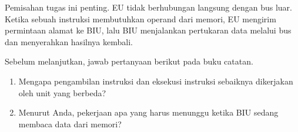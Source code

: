 \begin{infobox}
\vspace{1.1em}
Pemisahan tugas ini penting. EU tidak berhubungan langsung dengan
bus luar. Ketika sebuah instruksi membutuhkan operand dari memori,
EU mengirim permintaan alamat ke BIU, lalu BIU menjalankan pertukaran
data melalui bus dan menyerahkan hasilnya kembali.
\end{infobox}

\begin{aktivitasbox}
\vspace{1.1em}
Sebelum melanjutkan, jawab pertanyaan berikut pada buku catatan.
\begin{enumerate}
    \item Mengapa pengambilan instruksi dan eksekusi instruksi
          sebaiknya dikerjakan oleh unit yang berbeda?
    \item Menurut Anda, pekerjaan apa yang harus menunggu ketika BIU
          sedang membaca data dari memori?
\end{enumerate}
\end{aktivitasbox}
